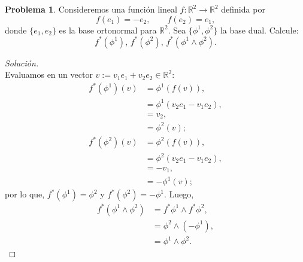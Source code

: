 \documentclass{article}
\theoremstyle{plain}
\theoremstyle{definition}
\newtheorem{ex}{Problema}
\theoremstyle{remark}
\renewcommand{\Re}{\mathbb{R}}
\begin{document}
  \begin{ex}
    Consideremos una funci\'on lineal $f:\Re^2 \to \Re^2$ definida por
    $$f(e_1)=-e_2,\qquad f(e_2) = e_1,$$
    donde $\{e_1,e_2\}$ es la base ortonormal para $\Re^2$. Sea $\{\phi^1,\phi^2\}$ la base dual. Calcule:
    $$f^*(\phi^1), \, f^*(\phi^2), \, f^*(\phi^1\wedge \phi^2).$$
  \end{ex}
  \begin{proof}[Soluci\'on]$ $\\
    Evaluamos en un vector $v:=v_1 e_1 + v_2 e_2 \in \Re^2$:
      \begin{align*}
        f^*(\phi^1) (v) & = \phi^1 (f(v)), \\ & = \phi^1(v_2e_1 - v_1 e_2),\\ &= v_2, \\ &= \phi^2 ( v);\\
        f^*(\phi^2) (v) & = \phi ^2(f(v)), \\ & = \phi^2(v_2e_1 - v_1 e_2),\\ & = -v_1 ,\\ &= -\phi^1 ( v);
      \end{align*}
      por lo que, $f^*(\phi^1) = \phi^2$ y $f^*(\phi^2) = - \phi^1$. Luego,
      \begin{align*}
        f^*(\phi^1\wedge \phi^2) & = f^*\phi^1 \wedge f^*\phi^2,\\ &= \phi^2\wedge(- \phi^1),\\ & = \phi^1 \wedge \phi^2.
      \end{align*}

  \end{proof}
\end{document}
